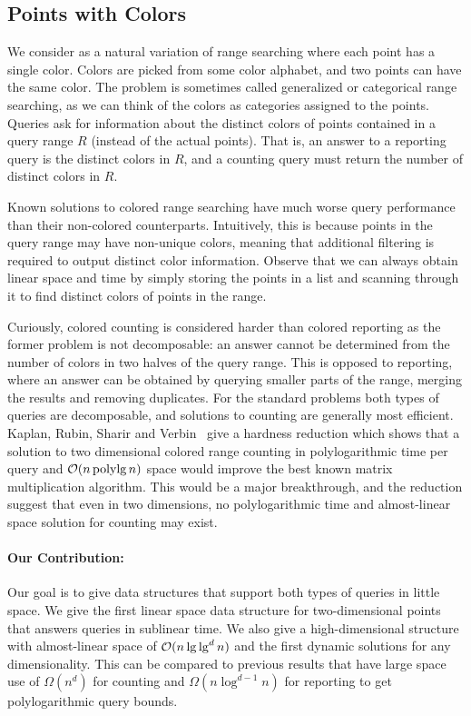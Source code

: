\subsection{Points with Colors}
We consider  as a natural variation of range searching where each point has a single color. Colors are picked from some color alphabet, and two points can have the same color. The problem is sometimes called generalized or categorical range searching, as we can think of the colors as categories assigned to the points. Queries ask for information about the distinct colors of points contained in a query range $R$ (instead of the actual points). That is, an answer to a reporting query is the distinct colors in $R$, and a counting query must return the number of distinct colors in $R$.

Known solutions to colored range searching have much worse query performance than their non-colored counterparts. Intuitively, this is because points in the query range may have non-unique colors, meaning that additional filtering is required to output distinct color information.
Observe that we can always obtain linear space and time by simply storing the points in a list and scanning through it to find distinct colors of points in the range. 

Curiously, colored counting is considered harder than colored reporting as the former problem is not decomposable: an answer cannot be determined from the number of colors in two halves of the query range. 
This is opposed to reporting, where an answer can be obtained by querying smaller parts of the range, merging the results and removing duplicates. For the standard problems both types of queries are decomposable, and solutions to counting are generally most efficient.
Kaplan, Rubin, Sharir and Verbin~\cite{kaplan2007counting} give a hardness reduction which shows that a solution to two dimensional colored range counting in polylogarithmic time per query and $\mathcal{O}(n \mathrm{\, polylg \,} n)$ space would improve the best known matrix multiplication algorithm. This would be a major breakthrough, and the reduction suggest that even in two dimensions, no polylogarithmic time and almost-linear space solution for counting may exist.


\paragraph{Our Contribution: } 
Our goal is to give data structures that support both types of queries in little space.
We give the first linear space data structure for two-dimensional points that answers queries in sublinear time. We also give a high-dimensional structure with almost-linear space of $\mathcal{O}(n \lg \lg^d n)$ and the first dynamic solutions for any dimensionality.
This can be compared to previous results that have large space use of $\Omega(n^d)$ for counting and $\Omega(n \log^{d-1} n)$ for reporting to get polylogarithmic query bounds. %

